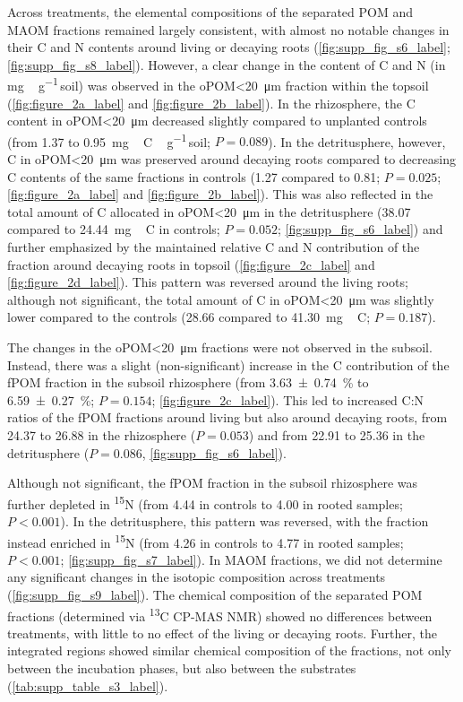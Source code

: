 Across treatments, the elemental compositions of the separated POM and MAOM fractions remained largely consistent, with almost no notable changes in their C and N contents around living or decaying roots (\cref{fig:supp_fig_s6_label}; \cref{fig:supp_fig_s8_label}). However, a clear change in the content of C and N (in \si{mg\,\gram^{-1}}\,soil) was observed in the oPOM<\SI{20}{\micro\metre} fraction within the topsoil (\cref{fig:figure_2a_label} and \cref{fig:figure_2b_label}). In the rhizosphere, the C content in oPOM<\SI{20}{\micro\metre} decreased slightly compared to unplanted controls (from \num{1.37} to \SI{0.95}{mg\,C\,\gram^{-1}}\,soil; \(P= 0.089\)). In the detritusphere, however, C in oPOM<\SI{20}{\micro\metre} was preserved around decaying roots compared to decreasing C contents of the same fractions in controls (\num{1.27} compared to \num{0.81}; \(P=0.025\); \cref{fig:figure_2a_label} and \cref{fig:figure_2b_label}). This was also reflected in the total amount of C allocated in oPOM<\SI{20}{\micro\metre} in the detritusphere (\num{38.07} compared to \SI{24.44}{mg\,C} in controls; \(P=0.052\); \cref{fig:supp_fig_s6_label}) and further emphasized by the maintained relative C and N contribution of the fraction around decaying roots in topsoil (\cref{fig:figure_2c_label} and \cref{fig:figure_2d_label}). This pattern was reversed around the living roots; although not significant, the total amount of C in oPOM<\SI{20}{\micro\metre} was slightly lower compared to the controls (\num{28.66} compared to \SI{41.30}{mg\,C}; \(P=0.187\)).

The changes in the oPOM<\SI{20}{\micro\metre} fractions were not observed in the subsoil. Instead, there was a slight (non-significant) increase in the C contribution of the fPOM fraction in the subsoil rhizosphere (from \SI{3.63 \pm 0.74}{\percent} to \SI{6.59 \pm 0.27}{\percent}; \(P=0.154\); \cref{fig:figure_2c_label}). This led to increased C:N ratios of the fPOM fractions around living but also around decaying roots, from \num{24.37} to \num{26.88} in the rhizosphere (\(P=0.053\)) and from \num{22.91} to \num{25.36} in the detritusphere (\(P=0.086\), \cref{fig:supp_fig_s6_label}).

Although not significant, the fPOM fraction in the subsoil rhizosphere was further depleted in \textsuperscript{15}N (from \num{4.44} in controls to \SI{4.00}{\permil} in rooted samples; \(P < 0.001\)). In the detritusphere, this pattern was reversed, with the fraction instead enriched in \textsuperscript{15}N (from \num{4.26} in controls to \SI{4.77}{\permil} in rooted samples; \(P < 0.001\); \cref{fig:supp_fig_s7_label}). In MAOM fractions, we did not determine any significant changes in the isotopic composition across treatments (\cref{fig:supp_fig_s9_label}). The chemical composition of the separated POM fractions (determined via \textsuperscript{13}C CP-MAS NMR) showed no differences between treatments, with little to no effect of the living or decaying roots. Further, the integrated regions showed similar chemical composition of the fractions, not only between the incubation phases, but also between the substrates (\cref{tab:supp_table_s3_label}).

